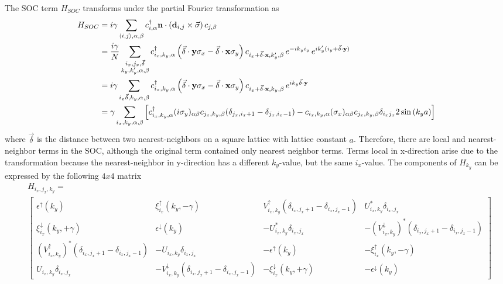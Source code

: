 The SOC term $H_{SOC}$ transforms under the partial Fourier transformation as
\begin{align} \nonumber
    H_{SOC} &= i \gamma \sum_{\langle i,j \rangle, \alpha, \beta} c^{\dag}_{i,\alpha} \vb{n} \cdot \left(\vb{d}_{i,j} \times \Vec{\sigma} \right) c_{j,\beta} \\ \nonumber
    &= \frac{i\gamma}{N} \sum_{\substack{i_x, j_x, \Vec{\delta}\\ k_y, k'_y, \alpha, \beta}} c^{\dag}_{i_x, k_y, \alpha}\left( \Vec{\delta}\cdot \vb{y}\sigma_x - \Vec{\delta}\cdot\vb{x}\sigma_y\right) c_{i_x+\Vec{\delta}\cdot\vb{x},k'_y, \beta}\,e^{-ik_yi_y}\,e^{ik'_y(i_y+\Vec{\delta}\cdot\vb{y})}\\ \nonumber
    &= i \gamma \sum_{i_x \Vec{\delta}, k_y, \alpha, \beta} c^{\dag}_{i_x,k_y,\alpha}\left( \Vec{\delta}\cdot \vb{y}\sigma_x - \Vec{\delta}\cdot\vb{x}\sigma_y \right)c_{i_x+\Vec{\delta}\cdot\vb{x},k_y,\beta}\, e^{ik_y\Vec{\delta}\cdot\vb{y}} \\ \nonumber
    &= \gamma \sum_{i_x, k_y, \alpha, \beta} \left[ c^{\dag}_{i_x,k_y, \alpha} (i\sigma_y)_{\alpha\beta} c_{j_x,k_y,\beta}(\delta_{j_x, i_x+1} - \delta_{j_x, i_x-1}) - c_{i_x, k_y, \alpha} (\sigma_x)_{\alpha\beta} c_{j_x,k_y,\beta} \delta_{i_xj_x} 2 \sin{(k_ya)} \right]
\end{align}
where $\Vec{\delta}$ is the distance between two nearest-neighbors on a square lattice with lattice constant $a$.
Therefore, there are local and nearest-neighbor terms in the SOC, although the original term contained only nearest neighbor terms.
Terms local in x-direction arise due to the transformation because the nearest-neighbor in y-direction has a different $k_y$-value, but the same $i_x$-value. \newline
The components of $H_{k_y}$ can be expressed by the following $4x4$ matrix
\begin{align}\label{eq:hamiltonian_num}
    &H_{i_x, j_x, k_y} = \\ \nonumber
   & \left[ {\begin{smallmatrix}
            \epsilon^{\uparrow}(k_y) & \xi^{\uparrow}_{i_x}(k_y,-\gamma) & V^{\uparrow}_{i_x, k_y}(\delta_{i_x,j_x+1}-\delta_{i_x,j_x-1})& U^*_{i_x, k_y}\delta_{i_x,j_x} \\
          \xi^{\downarrow}_{i_x}(k_y, +\gamma) & \epsilon^{\downarrow}(k_y) & -U^*_{i_x, k_y}\delta_{i_x,j_x} & -(V^{\downarrow}_{i_x, k_y})^*(\delta_{i_x,j_x+1}-\delta_{i_x,j_x-1})\\
          (V^{\uparrow}_{i_x, k_y})^*(\delta_{i_x,j_x+1}-\delta_{i_x,j_x-1}) & -U_{i_x, k_y}\delta_{i_x,j_x}& -\epsilon^{\uparrow}(k_y) & -\xi^{\uparrow}_{i_x}(k_y, -\gamma) \\
          U_{i_x, k_y}\delta_{i_x,j_x} & -V^{\downarrow}_{i_x, k_y} (\delta_{i_x,j_x+1}-\delta_{i_x,j_x-1})  & -\xi^{\downarrow}_{i_x}(k_y, +\gamma) & -\epsilon^{\downarrow}(k_y)
        \end{smallmatrix} } 
        \right]
\end{align}

